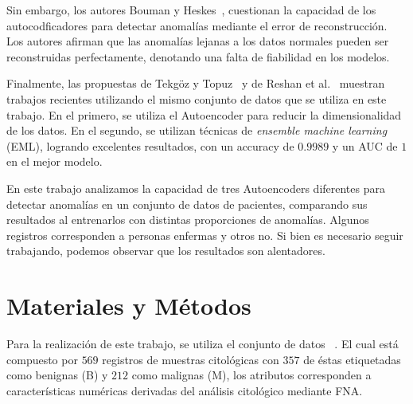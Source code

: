 \documentclass{llncs}
\begin{document}
Sin embargo, los autores Bouman y Heskes~\parencite{DBLP:journals/corr/abs-2501-13864}, cuestionan la capacidad de los autocodficadores
para detectar anomalías mediante el error de reconstrucción. Los autores afirman que las anomalías lejanas a los datos normales pueden ser reconstruidas perfectamente, denotando una falta de fiabilidad en los modelos.

Finalmente, las propuestas de Tekgöz y Topuz~\parencite{autoencodersforclinicaldataanalysis} y de Reshan et al.~\parencite{life13102093} muestran trabajos recientes utilizando el mismo conjunto de datos que se utiliza en este trabajo. En el primero, se utiliza el Autoencoder para reducir la dimensionalidad de los datos. En el segundo, se utilizan técnicas de \emph{ensemble machine learning} (EML), logrando excelentes resultados, con un accuracy de $0.9989$ y un AUC de $1$ en el mejor modelo.

En este trabajo analizamos la capacidad de tres Autoencoders diferentes para detectar anomalías en un conjunto de datos de pacientes, comparando sus resultados al entrenarlos con distintas proporciones de anomalías. Algunos registros corresponden a personas enfermas y otros no. Si bien es necesario seguir trabajando, podemos observar que los resultados son alentadores. 

\section{Materiales y Métodos}


Para la realización de este trabajo, se utiliza el conjunto de datos ~\parencite{kaggle_breast_cancer_wisconsin}. El cual está compuesto por $569$ registros de muestras citológicas con $357$ de éstas etiquetadas como benignas (B) y $212$ como malignas (M), los atributos corresponden a características numéricas derivadas del análisis citológico mediante FNA.




\end{document}

